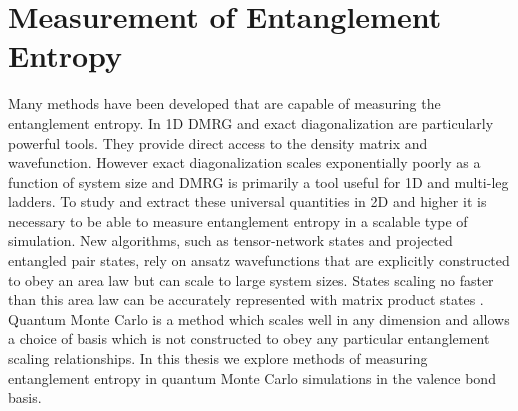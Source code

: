 \section{Measurement of Entanglement Entropy}

Many methods have been developed that are capable of measuring the entanglement entropy. In 1D DMRG and exact diagonalization are particularly powerful tools. They provide direct access to the density matrix and wavefunction. However exact diagonalization scales exponentially poorly as a function of system size and DMRG is primarily a tool useful for 1D and multi-leg ladders. To study and extract these universal quantities in 2D and higher it is necessary to be able to measure entanglement entropy in a scalable type of simulation. 
New algorithms, such as tensor-network states and projected entangled pair states, rely on ansatz wavefunctions that are explicitly constructed to obey an area law \cite{MERA,PEPS1,PEPS2} but can scale to large system sizes. States scaling no faster than this area law can be accurately represented with matrix product states \cite{MPS_DMRG}. Quantum Monte Carlo is a method which scales well in any dimension and allows a choice of basis which is not constructed to obey any particular entanglement scaling relationships. In this thesis we explore methods of measuring entanglement entropy in quantum Monte Carlo simulations in the valence bond basis.



